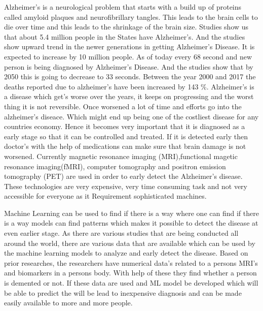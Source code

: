 \documentclass[12pt,onecolumn]{report}
\begin{document}
Alzheimer's is a neurological problem that starts with a build up of proteins called amyloid plaques and neurofibrillary tangles. This leads to the brain cells to die over time and this leads to the shrinkage of the brain size\cite{mayo_alzheimers_2024}. Studies show us that about 5.4 million people in the States have Alzheimer's. And the studies show upward trend in the newer generations in getting Alzheimer's Disease. It is expected to increase by 10 million people. As of today every 68 second and new person is being diagnosed by Alzheimer's Disease. And the studies show that by 2050 this is going to decrease to 33 seconds\cite{2012131}. Between the year 2000 and 2017 the deaths reported due to alzheimer's have been increased by 143 \%\cite{2019321}. Alzheimer's is a disease which get's worse over the years, it keeps on progressing and the worst thing it is not reversible. Once worsened a lot of time and efforts go into the alzheimer's diseace. Which might end up being one of the costliest disease for any countries economy\cite{10.3389/fnagi.2024.1363458}. Hence it becomes very important that it is diagnosed as a early stage so that it can be controlled and treated. If it is detected early then doctor's with the help of medications can make sure that brain damage is not worsened. Currently magnetic resonance imaging (MRI),functional magetic resonance imaging(fMRI), computer tomography and positron emission tomography (PET) are used in order to early detect the Alzheimer's disease. These technologies are very expensive, very time consuming task and not very accessible for everyone as it Requirement sophisticated machines.

Machine Learning can be used to find if there is a way where one can find if there is a way models can find patterns which makes it possible to detect the disease at even earlier stage. As there are various studies that are being conducted all around the world, there are various data that are available which can be used by the machine learning models to analyze and early detect the disease. Based on prior researches, the researchers have numerical data's related to a persons MRI's and biomarkers in a persons body. With help of these they find whether a person is demented or not. If these data are used and ML model be developed which will be able to predict the will be lead to inexpensive diagnosis and can be made easily available to more and more people.
\end{document}
